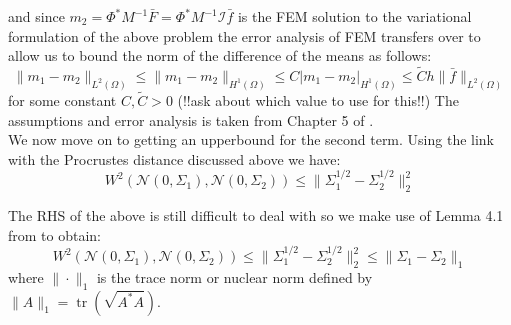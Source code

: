 \documentclass{article}
\theoremstyle{definition}
\theoremstyle{remark}
\begin{document}
and since $m_2=\Phi^{*}M^{-1}\bar{F}=\Phi^{*}M^{-1}\mathcal{I}\bar{f}$ is the FEM solution to the variational formulation of the above problem the error analysis of FEM transfers over to allow us to bound the norm of the difference of the means as follows:
\begin{equation}
    \label{bound_on_diff_means}
    \|m_1-m_2\|_{L^{2}(\Omega)}\leq\|m_1-m_2\|_{H^{1}(\Omega)}\leq C|m_1-m_2|_{H^{1}(\Omega)}\leq \tilde{C}h\|\bar{f}\|_{L^2(\Omega)}
\end{equation}
for some constant $C,\tilde{C}>0$ (!!ask about which value to use for this!!)
The assumptions and error analysis is taken from Chapter 5 of \cite{larsson2008partial}. \\

We now move on to getting an upperbound for the second term. Using the link with the Procrustes distance discussed above we have:
\begin{equation*}
    W^2(\mathcal{N}(0,\Sigma_1),\mathcal{N}(0,\Sigma_2))\leq\|\Sigma_{1}^{1/2}-\Sigma_{2}^{1/2}\|_{2}^{2}
\end{equation*}

The RHS of the above is still difficult to deal with so we make use of Lemma 4.1 from \cite{powers1970free} to obtain:
\begin{equation*}
    W^2(\mathcal{N}(0,\Sigma_1),\mathcal{N}(0,\Sigma_2))\leq\|\Sigma_{1}^{1/2}-\Sigma_{2}^{1/2}\|_{2}^{2}\leq\|\Sigma_1-\Sigma_2\|_{1}
\end{equation*}
where $\|\cdot\|_1$ is the trace norm or nuclear norm defined by $\|A\|_{1}=\operatorname{tr}(\sqrt{A^{*}A})$.
\end{document}
